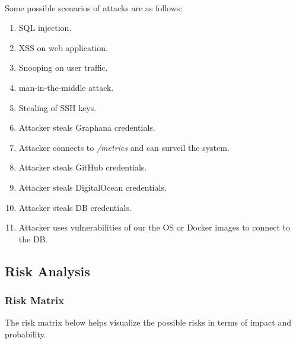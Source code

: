 \paragraph{} Some possible scenarios of attacks are as follows:
\begin{enumerate}
	\item SQL injection. %
	\item XSS on web application.%
	\item Snooping on user traffic.%
	\item man-in-the-middle attack.%
	\item Stealing of SSH keys.%
	\item Attacker steals Graphana credentials.%
	\item Attacker connects to \textit{/metrics} and can surveil the system.
	\item Attacker steals GitHub credentials.%
	\item Attacker steals DigitalOcean credentials.%
	\item Attacker steals DB credentials.%
	\item Attacker uses vulnerabilities of our the OS or Docker images to connect to the DB.%
\end{enumerate}

\subsection{Risk Analysis}
\subsubsection{Risk Matrix}
The risk matrix below helps visualize the possible risks in terms of impact and probability. %

